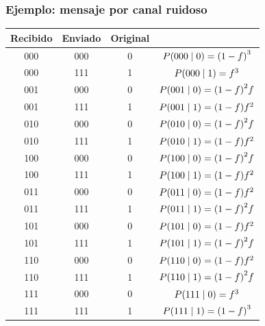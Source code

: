 \documentclass[table]{beamer}
\begin{document}
\begin{frame}
    \frametitle{Ejemplo: mensaje por canal ruidoso}
    \begin{center}
        \begin{tabular}{cccc}
            Recibido & Enviado & Original & \\
            \hline
            000 & 000 & 0 & $\prob{000 \mid 0} = \parens{1 - f}^{3}$ \\
            000 & 111 & 1 & $\prob{000 \mid 1} = f^{3}$ \\
            001 & 000 & 0 & $\prob{001 \mid 0} = \parens{1 - f}^{2} f$ \\
            001 & 111 & 1 & $\prob{001 \mid 1} = \parens{1 - f} f^{2}$ \\
            010 & 000 & 0 & $\prob{010 \mid 0} = \parens{1 - f}^{2} f$ \\
            010 & 111 & 1 & $\prob{010 \mid 1} = \parens{1 - f} f^{2}$ \\
            100 & 000 & 0 & $\prob{100 \mid 0} = \parens{1 - f}^{2} f$ \\
            100 & 111 & 1 & $\prob{100 \mid 1} = \parens{1 - f} f^{2}$ \\
            011 & 000 & 0 & $\prob{011 \mid 0} = \parens{1 - f} f^{2}$ \\
            011 & 111 & 1 & $\prob{011 \mid 1} = \parens{1 - f}^{2} f$ \\
            101 & 000 & 0 & $\prob{101 \mid 0} = \parens{1 - f} f^{2}$ \\
            101 & 111 & 1 & $\prob{101 \mid 1} = \parens{1 - f}^{2} f$ \\
            110 & 000 & 0 & $\prob{110 \mid 0} = \parens{1 - f} f^{2}$ \\
            110 & 111 & 1 & $\prob{110 \mid 1} = \parens{1 - f}^{2} f$ \\
            111 & 000 & 0 & $\prob{111 \mid 0} = f^{3}$ \\
            111 & 111 & 1 & $\prob{111 \mid 1} = \parens{1 - f}^{3}$
        \end{tabular}
    \end{center}
\end{frame}
\end{document}
